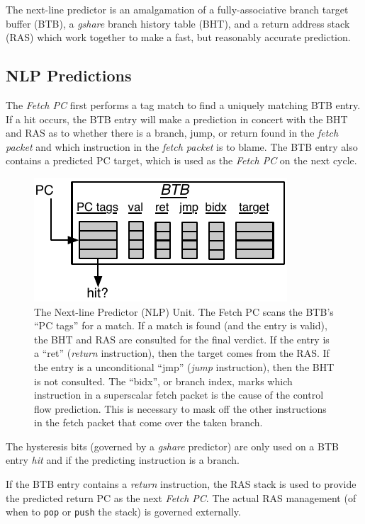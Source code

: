 The next-line predictor is an amalgamation of a fully-associative branch target buffer (BTB), a {\em gshare} branch history table (BHT), and a return address stack (RAS) which work together to make a fast, but reasonably accurate prediction.

\subsection{NLP Predictions}

The {\em Fetch PC} first performs a tag match to find a uniquely matching BTB entry.  
If a hit occurs, the BTB entry will make a prediction in concert with the BHT and RAS as to whether there is a branch, jump, or return found in the {\em fetch packet} and which instruction in the {\em fetch packet} is to blame.  
The BTB entry also contains a predicted PC target, which is used as the {\em Fetch PC} on the next cycle.


\begin{figure}[ht]
	\centering
	\centerline{\includegraphics[scale =1] {figures/btb}}
	\caption{ \small The Next-line Predictor (NLP) Unit. The Fetch PC scans the BTB's ``PC tags'' for a match.  If a match is found (and the entry is valid), the BHT and RAS are consulted for the final verdict.  If the entry is a ``ret'' ({\em return} instruction), then the target comes from the RAS.  If the entry is a unconditional ``jmp'' ({\em jump} instruction), then the BHT is not consulted. The ``bidx'', or branch index, marks which instruction in a superscalar fetch packet is the cause of the control flow prediction. This is necessary to mask off the other instructions in the fetch packet that come over the taken branch.}
	\label{fig:btb}
\end{figure}




The hysteresis bits (governed by a {\em gshare} predictor) are only used on a BTB entry {\em hit} and if the predicting instruction is a branch.

If the BTB entry contains a {\em return} instruction, the RAS stack is used to provide the predicted return PC as the next {\em Fetch PC}. The actual RAS management (of when to {\tt {pop}} or {\tt {push}} the stack) is governed externally. 

